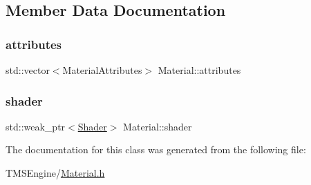 \subsection{Member Data Documentation}
\mbox{\label{class_material_a90f35060d118063ea0ef682ad7b36fac}} 
\subsubsection{\texorpdfstring{attributes}{attributes}}
{\footnotesize\ttfamily std\+::vector$<$Material\+Attributes$>$ Material\+::attributes\hspace{0.3cm}{\ttfamily [private]}}

\mbox{\label{class_material_a0acf8a8f7e55ddddcef3391e68ea74c5}} 
\subsubsection{\texorpdfstring{shader}{shader}}
{\footnotesize\ttfamily std\+::weak\+\_\+ptr$<$\hyperlink{class_shader}{Shader}$>$ Material\+::shader\hspace{0.3cm}{\ttfamily [private]}}



The documentation for this class was generated from the following file\+:\begin{DoxyCompactItemize}
\item 
T\+M\+S\+Engine/\hyperlink{_material_8h}{Material.\+h}\end{DoxyCompactItemize}
